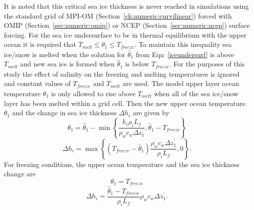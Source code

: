 It is noted that this critical sea ice thickness is never reached in
simulations using the standard grid of \mbox{MPI-OM} (Section~\ref{ch:numeric:curvilinear})
forced with OMIP (Section~\ref{sec:numeric:omip}) or NCEP (Section~\ref{sec:numeric:ncep}) surface forcing.
For the sea ice
undersurface to be in thermal equilibrium with the upper ocean it is
required that $T_{\mathit{melt}} \le \theta_1 \le T_{\mathit{freeze}}$.
To maintain this inequality
sea ice/snow is melted when the solution for $\hat{\theta}_1$ from
Eqn~\ref{iceundersurf} is above $T_{\mathit{melt}}$
and new sea ice is formed
when $\hat{\theta}_1$ is below $T_{\mathit{freeze}}$.
For the purposes of this study the effect of salinity on the freezing
and melting temperatures is ignored
and constant values of $T_{\mathit{freeze}}$
and $T_{\mathit{melt}}$ are used.
The model upper layer ocean temperature $\theta_1$
is only allowed to rise above $T_{\mathit{melt}}$ when all of
the sea ice/snow layer has been melted within a grid cell.
Then the new upper ocean temperature $\theta_1$
and the change in sea ice thickness $\Delta h_i$
are given by 
\begin{equation}
\label{melt1}
\theta_1 = \hat{\theta}_1 -
\min\left\{\frac{h_i{\rho_i}L_f}{\rho_w{c_w}\Delta{z}^{\prime}_1},
\hat{\theta}_1 - T_{\mathit{freeze}}\right\}
\end{equation}
\begin{equation}
\label{melt2}
\Delta{h_i} = \max\left\{ (T_{\mathit{freeze}} - \hat{\theta}_1)
\frac{\rho_w{c_w}\Delta{z}^{\prime}_1}{{\rho_i}L_f},0 \right\}  .
\end{equation}
For freezing conditions, 
the upper ocean temperature and the sea ice thickness change are
\begin{equation}
\label{freeze0}
\theta_1 = T_{\mathit{freeze}}
\end{equation}
\begin{equation}
\label{freezing}
\Delta h_i = \frac{\hat{\theta}_1 - T_{\mathit{freeze}}}{\rho_i L_f}
{\rho_w}c_w\Delta{z}^{\prime}_1 .
\end{equation}


